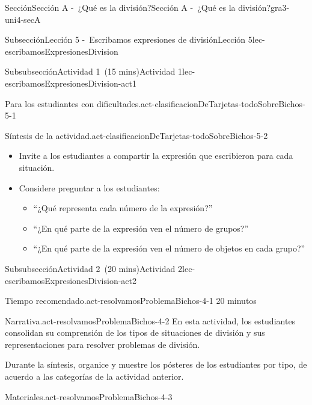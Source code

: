 \documentclass[oneside,10pt,]{article}
\newlength{\fillinmaxwidth}
\newlength{\fillincontract}
\newlength{\charmaxwidth}\setlength{\charmaxwidth}{0.5em}
\newlength{\charminwidth}\setlength{\charminwidth}{0.1em}
\newlength{\fillinheight}
\newcommand{\fillintext}[1]{%
\setlength{\fillinmaxwidth}{#1\charmaxwidth}%
\setlength{\fillincontract}{#1\charminwidth}%
\setlength{\fillinheight}{\baselineskip}\addtolength{\fillinheight}{1.2pt}%
\strut\nobreak\leaders\vbox{\hrule width 0.3pt height 0.3pt \vskip -1.2pt}\hskip 1\fillinmaxwidth minus \fillincontract\nobreak\strut%
}
\begin{document}
\begin{sectionptx}{Sección}{Sección A -~¿Qué es la división?}{}{Sección A -~¿Qué es la división?}{}{}{gra3-uni4-secA}
\begin{subsectionptx}{Subsección}{Lección 5 -~Escribamos expresiones de división}{}{Lección 5}{}{}{lec-escribamosExpresionesDivision}
\begin{subsubsectionptx}{Subsubsección}{Actividad 1~(15 mins)}{}{Actividad 1}{}{}{lec-escribamosExpresionesDivision-act1}
\begin{paragraphs}{Para los estudiantes con dificultades.}{act-clasificacionDeTarjetas-todoSobreBichos-5-1}
\end{paragraphs}%
\begin{paragraphs}{Síntesis de la actividad.}{act-clasificacionDeTarjetas-todoSobreBichos-5-2}%
%
\begin{itemize}[label=\textbullet]
\item{}Invite a los estudiantes a compartir la expresión que escribieron para cada situación.%
\item{}Considere preguntar a los estudiantes:%
\begin{itemize}[label=$\circ$]
\item{}``¿Qué representa cada número de la expresión?''%
\item{}``¿En qué parte de la expresión ven el número de grupos?''%
\item{}``¿En qué parte de la expresión ven el número de objetos en cada grupo?''%
\end{itemize}
%
\end{itemize}
\end{paragraphs}%
%
\end{subsubsectionptx}
%
%
\typeout{************************************************}
\typeout{************************************************}
%
\begin{subsubsectionptx}{Subsubsección}{Actividad 2~(20 mins)}{}{Actividad 2}{}{}{lec-escribamosExpresionesDivision-act2}
\par
\begin{paragraphs}{Tiempo recomendado.}{act-resolvamosProblemaBichos-4-1}%
20 minutos%
\end{paragraphs}%
\begin{paragraphs}{Narrativa.}{act-resolvamosProblemaBichos-4-2}%
En esta actividad, los estudiantes consolidan su comprensión de los tipos de situaciones de división y sus representaciones para resolver problemas de división.%
\par
Durante la síntesis, organice y muestre los pósteres de los estudiantes por tipo, de acuerdo a las categorías de la actividad anterior.%
\end{paragraphs}%
\begin{paragraphs}{Materiales.}{act-resolvamosProblemaBichos-4-3}%

\end{paragraphs}
\end{subsubsectionptx}
\end{subsectionptx}
\end{sectionptx}
\end{document}
